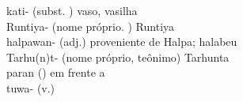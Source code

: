 
kati- (subst. \Neut) vaso, vasilha\\
Runtiya- (nome próprio. \Com) Runtiya\\
halpawan- (adj.) proveniente de Halpa; halabeu\\
Tarhu(n)t- (nome próprio, teônimo) Tarhunta\\
paran (\Prep) em frente a\\
tuwa- (v.)\\
